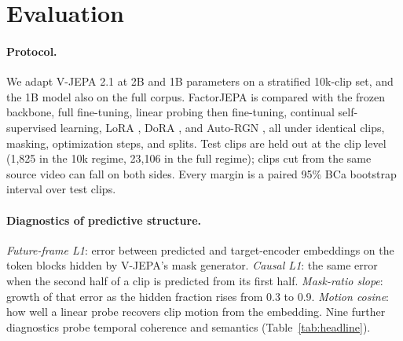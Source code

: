 \documentclass[letterpaper]{article} %
\begin{document}
\section{Evaluation}

\paragraph{Protocol.}
We adapt V-JEPA 2.1 at 2B and 1B parameters on a stratified 10k-clip set, and the 1B model also on the full corpus. FactorJEPA is compared with the frozen backbone, full fine-tuning, linear probing then fine-tuning, continual self-supervised learning, LoRA \cite{hu2022lora}, DoRA \cite{liu2024dora}, and Auto-RGN \cite{lee2023surgical}, all under identical clips, masking, optimization steps, and splits. Test clips are held out at the clip level (1,825 in the 10k regime, 23,106 in the full regime); clips cut from the same source video can fall on both sides. Every margin is a paired 95\% BCa bootstrap interval over test clips.

\paragraph{Diagnostics of predictive structure.}
\emph{Future-frame L1}: error between predicted and target-encoder embeddings on the token blocks hidden by V-JEPA's mask generator. \emph{Causal L1}: the same error when the second half of a clip is predicted from its first half. \emph{Mask-ratio slope}: growth of that error as the hidden fraction rises from 0.3 to 0.9. \emph{Motion cosine}: how well a linear probe recovers clip motion from the embedding. Nine further diagnostics probe temporal coherence and semantics (Table~\ref{tab:headline}).
\end{document}
